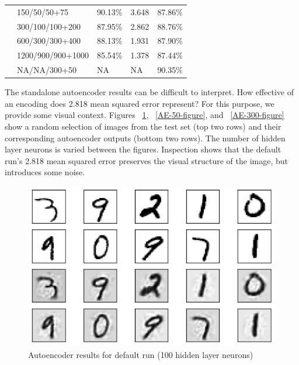 \documentclass[english]{tktltiki}
\begin{document}
\begin{table}[]
\begin{tabular}{@{}lllll@{}}
                         & 150/50/50+75      & 90.13\%          & 3.648              & 87.86\%            \\
                         & 300/100/100+200   & 87.95\%          & 2.862              & 88.76\%            \\
                         & 600/300/300+400   & 88.13\%          & 1.931              & 87.90\%             \\
                         & 1200/900/900+1000 & 85.54\%          & 1.378              & 87.44\%            \\
                         & NA/NA/300+50      & NA               & NA                 & 90.35\%           
\end{tabular}
\end{table} 

The standalone autoencoder results can be difficult to interpret.  How effective of an encoding does 2.818 mean squared error represent?  For this purpose, we provide some visual context.  Figures ~\ref{AE-100-figure}, ~\ref{AE-50-figure}, and ~\ref{AE-300-figure} show a random selection of images from the test set (top two rows) and their corresponding autoencoder outputs (bottom two rows).  The number of hidden layer neurons is varied between the figures.  Inspection shows that the default run's 2.818 mean squared error preserves the visual structure of the image, but introduces some noise.

\begin{figure}[]
\centering
\caption{Autoencoder results for default run (100 hidden layer neurons)}
\label{AE-100-figure}
\includegraphics[scale=0.75]{AE-100-Test-Crop}
\end{figure}
\end{document}

